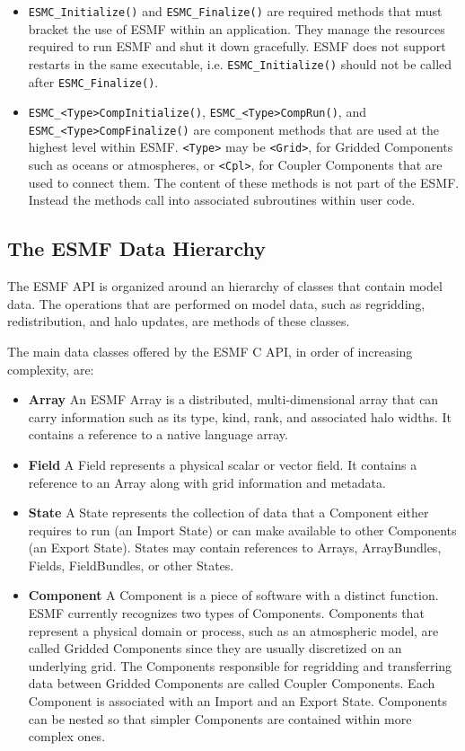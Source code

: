 \begin{itemize}

\item {\tt ESMC\_Initialize()} and {\tt ESMC\_Finalize()} are required 
methods that must bracket the use of ESMF within an application.  
They manage the resources required to run ESMF and shut it down
gracefully.  ESMF does not support restarts in the same executable, i.e.
{\tt ESMC\_Initialize()} should not be called after {\tt ESMC\_Finalize()}.
\item {\tt ESMC\_<Type>CompInitialize()}, {\tt ESMC\_<Type>CompRun()}, and 
{\tt ESMC\_<Type>CompFinalize()} are component methods that are used at the 
highest level within ESMF.  {\tt <Type>} may be {\tt <Grid>}, for 
Gridded Components such as oceans or atmospheres, or
{\tt <Cpl>}, for Coupler Components that are used to connect 
them.  The content of these methods is not part of the ESMF.  
Instead the methods call into associated subroutines within 
user code.

\end{itemize}

\subsection{The ESMF Data Hierarchy}

The ESMF API is organized around an hierarchy of classes that 
contain model data.  The operations that are performed
on model data, such as regridding, redistribution, and halo 
updates, are methods of these classes.  

The main data classes offered by the ESMF C API, in order of increasing complexity, are:
\begin{itemize}
\item {\bf Array} An ESMF Array is a distributed, multi-dimensional 
array that can carry information such as its type, kind, rank, and 
associated halo widths.  It contains a reference to a native language array.
\item {\bf Field}  A Field represents a physical scalar or vector field.
It contains a reference to an Array along with grid information and metadata.
\item {\bf State}  A State represents the collection of data that a 
Component either requires to run (an Import State) or can make 
available to other Components (an Export State).
States may contain references to Arrays, ArrayBundles, Fields,
FieldBundles, or other States. 
\item {\bf Component}  A Component is a piece of software 
with a distinct function.  ESMF currently recognizes two types 
of Components.  Components that represent a physical domain 
or process, such 
as an atmospheric model, are called Gridded Components since they are 
usually discretized on an underlying grid.  The Components 
responsible for regridding and transferring data between Gridded 
Components are called Coupler Components.  Each Component
is associated with an Import and an Export State.  Components
can be nested so that simpler Components are contained within more
complex ones.

\end{itemize}

